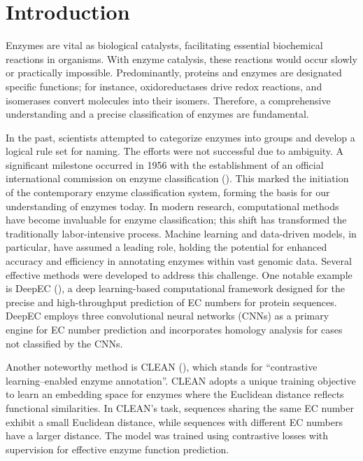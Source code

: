 \documentclass{bioinfo}
\begin{document}
\section{Introduction}

Enzymes are vital as biological catalysts, facilitating essential biochemical reactions in organisms.
With enzyme catalysis, these reactions would occur slowly or practically impossible.
Predominantly, proteins and enzymes are designated specific functions; for instance, oxidoreductases drive redox reactions, and isomerases convert molecules into their isomers.
Therefore, a comprehensive understanding and a precise classification of enzymes are fundamental.

In the past, scientists attempted to categorize enzymes into groups and develop a logical rule set for naming.
The efforts were not successful due to ambiguity.
A significant milestone occurred in 1956 with the establishment of an official international commission on enzyme classification (\cite{International_Union_of_Biochemistry_and_Molecular_Biology_Nomenclature_Committee1993-ey}). 
This marked the initiation of the contemporary enzyme classification system, forming the basis for our understanding of enzymes today.
In modern research, computational methods have become invaluable for enzyme classification; this shift has transformed the traditionally labor-intensive process.
Machine learning and data-driven models, in particular, have assumed a leading role, holding the potential for enhanced 
accuracy and efficiency in annotating enzymes within vast genomic data.
Several effective methods were developed to address this challenge.
One notable example is DeepEC (\cite{DeepEC}), a deep learning-based computational framework designed for the precise and high-throughput prediction of EC numbers for protein sequences.
DeepEC employs three convolutional neural networks (CNNs) as a primary engine for EC number prediction and incorporates homology analysis for cases not classified by the CNNs.

Another noteworthy method is CLEAN (\cite{CleanArticle}), which stands for ``contrastive learning–enabled 
enzyme annotation''. CLEAN adopts a unique training objective to learn an embedding space for enzymes where the Euclidean distance 
reflects functional similarities. In CLEAN's task, sequences sharing the same EC number exhibit a small Euclidean distance, while sequences 
with different EC numbers have a larger distance. The model was trained using contrastive losses with supervision for effective 
enzyme function prediction.
\end{document}
